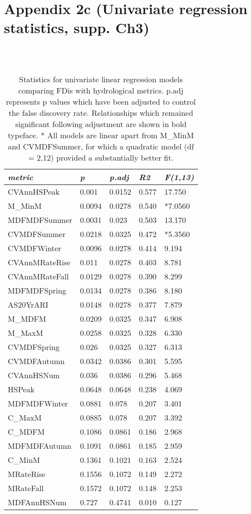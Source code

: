 \chapter[Appendix 2c (Univariate regression statistics, supp. Ch3)]{Appendix 2c (Univariate regression statistics, supp. Ch3)}

\begin{table}[ht]
\tiny
\centering
\caption[Statistics for univariate linear regression models.]{\small{Statistics for univariate linear regression models comparing FDis with hydrological metrics. p.adj represents p values which have been adjusted to control the false discovery rate. Relationships which remained significant following adjustment are shown in bold typeface. * All models are linear apart from M\_MinM and CVMDFSummer, for which a quadratic model (df = 2,12) provided a substantially better fit.}} \\
\label{Ch3sup4_T1} \\
{\tabulinesep=1.2mm
\begin{tabu} to 
\hline
\textit{metric} & \textit{p} & \textit{p.adj} & \textit{R2} & \textit{F(1,13)} \\
\hline
CVAnnHSPeak & 0.001 & 0.0152 & 0.577 & 17.750 \\
M\_MinM & 0.0094 & 0.0278 & 0.540 & *7.0560 \\
MDFMDFSummer & 0.0031 & 0.023 & 0.503 & 13.170 \\
CVMDFSummer & 0.0218 & 0.0325 & 0.472 & *5.3560 \\
CVMDFWinter & 0.0096 & 0.0278 & 0.414 & 9.194 \\
CVAnnMRateRise & 0.011 & 0.0278 & 0.403 & 8.781 \\
CVAnnMRateFall & 0.0129 & 0.0278 & 0.390 & 8.299 \\
MDFMDFSpring & 0.0134 & 0.0278 & 0.386 & 8.180 \\
AS20YrARI & 0.0148 & 0.0278 & 0.377 & 7.879 \\
M\_MDFM & 0.0209 & 0.0325 & 0.347 & 6.908 \\
M\_MaxM & 0.0258 & 0.0325 & 0.328 & 6.330 \\
CVMDFSpring & 0.026 & 0.0325 & 0.327 & 6.313 \\
CVMDFAutumn & 0.0342 & 0.0386 & 0.301 & 5.595 \\
CVAnnHSNum & 0.036 & 0.0386 & 0.296 & 5.468 \\
HSPeak & 0.0648 & 0.0648 & 0.238 & 4.069 \\
MDFMDFWinter & 0.0881 & 0.078 & 0.207 & 3.401 \\
C\_MaxM & 0.0885 & 0.078 & 0.207 & 3.392 \\
C\_MDFM & 0.1086 & 0.0861 & 0.186 & 2.968 \\
MDFMDFAutumn & 0.1091 & 0.0861 & 0.185 & 2.959 \\
C\_MinM & 0.1361 & 0.1021 & 0.163 & 2.524 \\
MRateRise & 0.1556 & 0.1072 & 0.149 & 2.272 \\
MRateFall & 0.1572 & 0.1072 & 0.148 & 2.253 \\
MDFAnnHSNum & 0.727 & 0.4741 & 0.010 & 0.127 \\
\hline
\end{tabu}}
\end{table}

\clearpage

